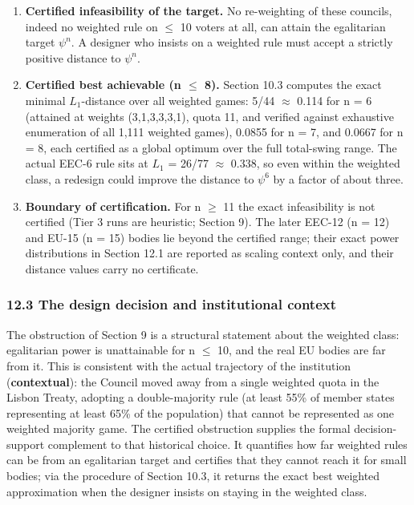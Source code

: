 \documentclass[
]{article}
\providecommand{\tightlist}{%
  \setlength{\itemsep}{0pt}\setlength{\parskip}{0pt}}
\begin{document}
\begin{enumerate}
\def\labelenumi{\arabic{enumi}.}
\tightlist
\item
  \textbf{Certified infeasibility of the target.} No re-weighting of
  these councils, indeed no weighted rule on \(\le\) 10 voters at all,
  can attain the egalitarian target \(\psi^n.\) A designer who insists
  on a weighted rule must accept a strictly positive distance to
  \(\psi^n.\)
\item
  \textbf{Certified best achievable (n \(\le\) 8).} Section 10.3
  computes the exact minimal \(L_1\)-distance over all weighted games:
  5/44 \(\approx\) 0.114 for n = 6 (attained at weights (3,1,3,3,3,1),
  quota 11, and verified against exhaustive enumeration of all 1,111
  weighted games), 0.0855 for n = 7, and 0.0667 for n = 8, each
  certified as a global optimum over the full total-swing range. The
  actual EEC-6 rule sits at \(L_1\) = 26/77 \(\approx\) 0.338, so even
  within the weighted class, a redesign could improve the distance to
  \(\psi^6\) by a factor of about three.
\item
  \textbf{Boundary of certification.} For n \(\ge\) 11 the exact
  infeasibility is not certified (Tier 3 runs are heuristic; Section 9).
  The later EEC-12 (n = 12) and EU-15 (n = 15) bodies lie beyond the
  certified range; their exact power distributions in Section 12.1 are
  reported as scaling context only, and their distance values carry no
  certificate.
\end{enumerate}

\subsubsection{12.3 The design decision and institutional
context}\label{the-design-decision-and-institutional-context}

The obstruction of Section 9 is a structural statement about the
weighted class: egalitarian power is unattainable for n \(\le\) 10, and
the real EU bodies are far from it. This is consistent with the actual
trajectory of the institution (\textbf{contextual}): the Council moved
away from a single weighted quota in the Lisbon Treaty, adopting a
double-majority rule (at least 55\% of member states representing at
least 65\% of the population) that cannot be represented as one weighted
majority game. The certified obstruction supplies the formal
decision-support complement to that historical choice. It quantifies how
far weighted rules can be from an egalitarian target and certifies that
they cannot reach it for small bodies; via the procedure of Section
10.3, it returns the exact best weighted approximation when the designer
insists on staying in the weighted class.
\end{document}
